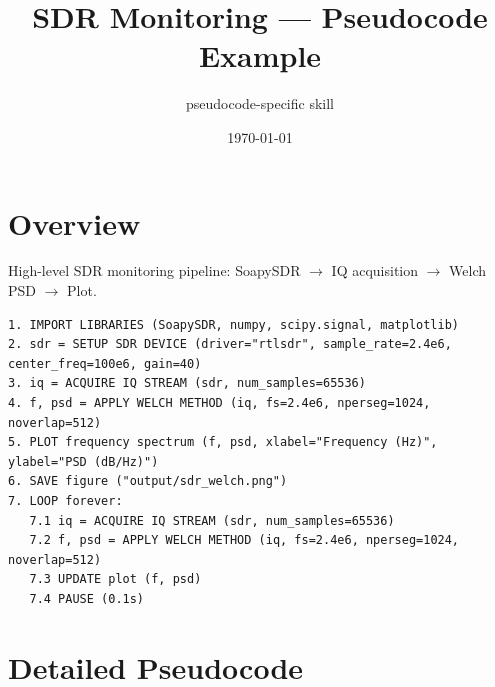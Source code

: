 \documentclass[11pt]{article}
\title{SDR Monitoring --- Pseudocode Example}
\author{pseudocode-specific skill}
\date{\today}
\begin{document}
\maketitle

\section*{Overview}

High-level SDR monitoring pipeline: SoapySDR $\rightarrow$ IQ acquisition $\rightarrow$ Welch PSD $\rightarrow$ Plot.

\begin{lstlisting}[language={},caption={High-level flow (pseudocode-general)}]
1. IMPORT LIBRARIES (SoapySDR, numpy, scipy.signal, matplotlib)
2. sdr = SETUP SDR DEVICE (driver="rtlsdr", sample_rate=2.4e6, center_freq=100e6, gain=40)
3. iq = ACQUIRE IQ STREAM (sdr, num_samples=65536)
4. f, psd = APPLY WELCH METHOD (iq, fs=2.4e6, nperseg=1024, noverlap=512)
5. PLOT frequency spectrum (f, psd, xlabel="Frequency (Hz)", ylabel="PSD (dB/Hz)")
6. SAVE figure ("output/sdr_welch.png")
7. LOOP forever:
   7.1 iq = ACQUIRE IQ STREAM (sdr, num_samples=65536)
   7.2 f, psd = APPLY WELCH METHOD (iq, fs=2.4e6, nperseg=1024, noverlap=512)
   7.3 UPDATE plot (f, psd)
   7.4 PAUSE (0.1s)
\end{lstlisting}

\newpage

\section*{Detailed Pseudocode}
\end{document}
